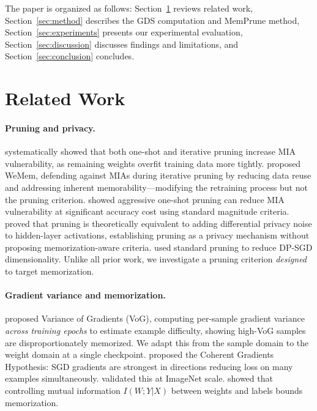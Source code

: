 \documentclass{article}
\begin{document}
The paper is organized as follows: Section~\ref{sec:related} reviews related work, Section~\ref{sec:method} describes the GDS computation and MemPrune method, Section~\ref{sec:experiments} presents our experimental evaluation, Section~\ref{sec:discussion} discusses findings and limitations, and Section~\ref{sec:conclusion} concludes.

\section{Related Work}
\label{sec:related}

\paragraph{Pruning and privacy.}
\citet{yuan2022membership} systematically showed that both one-shot and iterative pruning increase MIA vulnerability, as remaining weights overfit training data more tightly. \citet{shang2025wemem} proposed WeMem, defending against MIAs during iterative pruning by reducing data reuse and addressing inherent memorability---modifying the retraining process but not the pruning criterion. \citet{wang2021against} showed aggressive one-shot pruning can reduce MIA vulnerability at significant accuracy cost using standard magnitude criteria. \citet{huang2020privacy} proved that pruning is theoretically equivalent to adding differential privacy noise to hidden-layer activations, establishing pruning as a privacy mechanism without proposing memorization-aware criteria. \citet{adamczewski2023differential} used standard pruning to reduce DP-SGD dimensionality. Unlike all prior work, we investigate a pruning criterion \emph{designed} to target memorization.

\paragraph{Gradient variance and memorization.}
\citet{agarwal2022estimating} proposed Variance of Gradients (VoG), computing per-sample gradient variance \emph{across training epochs} to estimate example difficulty, showing high-VoG samples are disproportionately memorized. We adapt this from the sample domain to the weight domain at a single checkpoint. \citet{chatterjee2020coherent} proposed the Coherent Gradients Hypothesis: SGD gradients are strongest in directions reducing loss on many examples simultaneously. \citet{zielinski2020weak} validated this at ImageNet scale. \citet{harutyunyan2020improving} showed that controlling mutual information $I(W; Y|X)$ between weights and labels bounds memorization.
\end{document}

